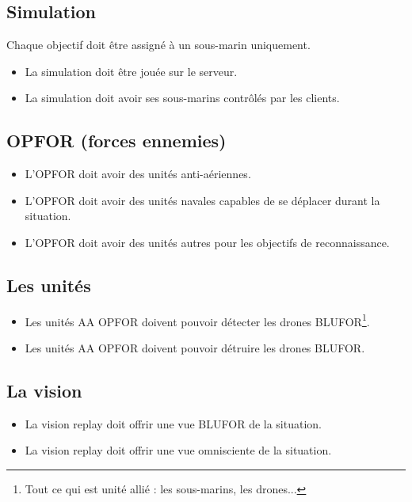 \subsection{Simulation}

Chaque objectif doit être assigné à un sous-marin uniquement.

\begin{itemize}
	\item La simulation doit être jouée sur le serveur.
	\item La simulation doit avoir ses sous-marins contrôlés par les clients.
\end{itemize}


\subsection{OPFOR (forces ennemies)}
\begin{itemize}
	\item L'OPFOR doit avoir des unités anti-aériennes.
	\item L'OPFOR doit avoir des unités navales capables de se déplacer durant la situation.
	\item L'OPFOR doit avoir des unités autres pour les objectifs de reconnaissance.
\end{itemize}

\subsection{Les unités}
\begin{itemize}
	\item Les unités AA OPFOR doivent pouvoir détecter les drones BLUFOR\footnote{Tout ce qui est unité allié :  les sous-marins, les drones...}.
	\item Les unités AA OPFOR doivent pouvoir détruire les drones BLUFOR.
\end{itemize}


\subsection{La vision}	
\begin{itemize}
	\item La vision replay doit offrir une vue BLUFOR de la situation.
	\item La vision replay doit offrir une vue omnisciente de la situation.
\end{itemize}

